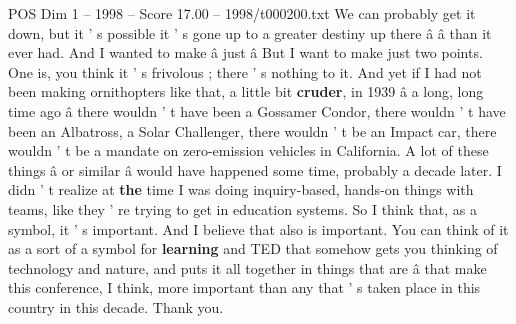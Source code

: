 \begin{textsample}{POS Dim 1 – 1998 – Score 17.00 – 1998/t000200.txt}
We can probably get it down, but it ' s possible it ' s gone up to a greater destiny up there â â than it ever had.
And I wanted to make â just â But I want to make just two points.
One is, you think it ' s frivolous ; there ' s nothing to it.
And yet if I had not been making ornithopters like that, a little bit \textbf{cruder}, in 1939 â a long, long time ago â there wouldn ' t have been a Gossamer Condor, there wouldn ' t have been an Albatross, a Solar Challenger, there wouldn ' t be an Impact car, there wouldn ' t be a mandate on zero-emission vehicles in California.
A lot of these things â or similar â would have happened some time, probably a decade later.
I didn ' t realize at \textbf{the} time I was doing inquiry-based, hands-on things with teams, like they ' re trying to get in education systems.
So I think that, as a symbol, it ' s important.
And I believe that also is important.
You can think of it as a sort of a symbol for \textbf{learning} and TED that somehow gets you thinking of technology and nature, and puts it all together in things that are â that make this conference, I think, more important than any that ' s taken place in this country in this decade.
Thank you.

\end{textsample}
